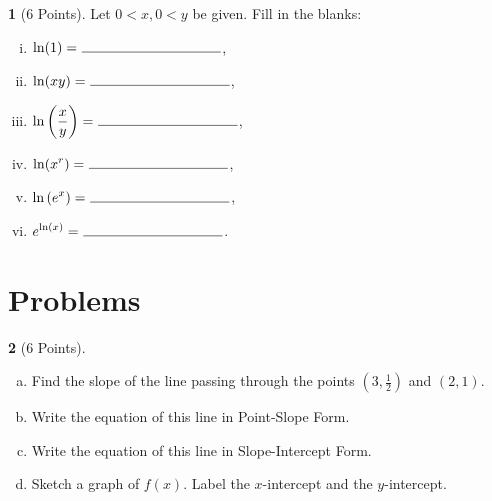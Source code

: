 \documentclass[12pt]{amsart}
\theoremstyle{definition}
\newtheorem{thm}{}
\theoremstyle{definition}
\begin{document}
\begin{thm}[6 Points]\label{ex2}
  Let $0 < x, 0 < y$ be given.
  Fill in the blanks:
  \vspace{.15in}
  \begin{multicols}{2}
    \begin{enumerate}[(i)]
    \item
      $\displaystyle{\ln(1) =\ \line(1,0){100}}$,
      \vspace{.15in}
    \item
      $\displaystyle{\ln(xy) =\ \line(1,0){100}}$,
      \vspace{.15in}
      \item
        $\displaystyle{\ln\left(\frac{x}{y}\right) =\ \line(1,0){100}}$,
        \vspace{.15in}
      \item
        $\displaystyle{\ln(x^r) =\ \line(1,0){100}}$,
        \vspace{.15in}
      \item
        $\displaystyle{\ln\left(e^x\right) =\ \line(1,0){100}}$,
        \vspace{.15in}
      \item
        $\displaystyle{e^{\ln(x)} =\ \line(1,0){100}}$.
    \end{enumerate}
  \end{multicols}
\end{thm}

\newpage

\section{Problems}
\setcounter{thm}{0}
\begin{thm}[6 Points]\label{ex5}
  \begin{enumerate}[(a)]
  \item
    Find the slope of the line passing through the points $\left(3,\frac{1}{2}\right)$ and $(2,1)$.
    \vspace{2in}
  \item
    Write the equation of this line in Point-Slope Form.
    \vspace{2in}
  \item
    Write the equation of this line in Slope-Intercept Form.
    \vspace{2in}
  \item
    Sketch a graph of $f(x)$.
    Label the $x$-intercept and the $y$-intercept.
  \end{enumerate}
\end{thm}
\end{document}
